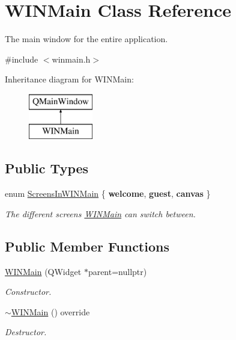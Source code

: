 \hypertarget{class_w_i_n_main}{}\section{W\+I\+N\+Main Class Reference}
\label{class_w_i_n_main}


The main window for the entire application.  




{\ttfamily \#include $<$winmain.\+h$>$}

Inheritance diagram for W\+I\+N\+Main\+:\begin{figure}[H]
\begin{center}
\leavevmode
\includegraphics[height=2.000000cm]{class_w_i_n_main}
\end{center}
\end{figure}
\subsection*{Public Types}
\begin{DoxyCompactItemize}
\item 
\mbox{\label{class_w_i_n_main_a2ffef4f00d863ba1ff8a1cc725a6b1f7}} 
enum \mbox{\hyperlink{class_w_i_n_main_a2ffef4f00d863ba1ff8a1cc725a6b1f7}{Screens\+In\+W\+I\+N\+Main}} \{ {\bfseries welcome}, 
{\bfseries guest}, 
{\bfseries canvas}
 \}
\begin{DoxyCompactList}\small\item\em The different screens \mbox{\hyperlink{class_w_i_n_main}{W\+I\+N\+Main}} can switch between. \end{DoxyCompactList}\end{DoxyCompactItemize}
\subsection*{Public Member Functions}
\begin{DoxyCompactItemize}
\item 
\mbox{\hyperlink{class_w_i_n_main_a6bc8d511a5fc73cb8378e1baefb0b2bd}{W\+I\+N\+Main}} (Q\+Widget $\ast$parent=nullptr)
\begin{DoxyCompactList}\small\item\em Constructor. \end{DoxyCompactList}\item 
\mbox{\hyperlink{class_w_i_n_main_a5e1564b7f926df4af04c224e8bb3bcb2}{$\sim$\+W\+I\+N\+Main}} () override
\begin{DoxyCompactList}\small\item\em Destructor. \end{DoxyCompactList}\end{DoxyCompactItemize}

